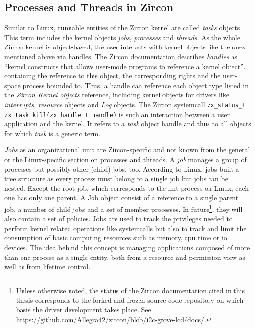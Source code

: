 \subsection{Processes and Threads in Zircon}\label{sec:processes-zircon}
Similar to Linux, runnable entities of the Zircon kernel are called \textit{tasks} objects.
This term includes the kernel objects \textit{jobs}, \textit{processes} and \textit{threads}.
As the whole Zircon kernel is object-based, the user interacts with kernel objects like the ones mentioned above via handles.
The Zircon documentation describes \textit{handles} as ``kernel constructs that allows user-mode programs to reference a kernel object''\cite{zircon-process}, containing the reference to this object, the corresponding rights and the user-space process bounded to.
Thus, a handle can reference each object type listed in the \textit{Zircon Kernel objects} reference\cite{zircon-objects}, including kernel objects for drivers like \textit{interrupts}, \textit{resource} objects and \textit{Log} objects.
The Zircon systemcall \texttt{zx\_status\_t zx\_task\_kill(zx\_handle\_t handle)} is such an interaction between a user application and the kernel. 
It refers to a \textit{task} object handle and thus to all objects for which \textit{task} is a generic term\cite{zircon-task}.

\textit{Jobs} as an organizational unit are Zircon-specific and not known from the general or the Linux-specific section on processes and threads.
A \textit{job} manages a group of processes but possibly other (child) jobs, too.
According to Linux, jobs built a tree structure as every process must belong to a single job but jobs can be nested.
Except the root job, which corresponds to the init process on Linux, each one has only one parent.
A Job object consist of a reference to a single parent job, a number of child jobs and a set of member processes.
In future\footnote{Unless otherwise noted, the status of the Zircon documentation cited in this thesis corresponds to the forked and frozen source code repository on which basis the driver development takes place. See \url{https://github.com/Allegra42/zircon/blob/i2c-grove-lcd/docs/}.}, they will also contain a set of policies\cite{zircon-job}.
Jobs are used to track the privileges needed to perform kernel related operations like systemcalls but also to track and limit the consumption of basic computing resources such as memory, \ac{cpu} time or \ac{io} devices\cite{zircon-job}.
The idea behind this concept is managing applications composed of more than one process as a single entity, both from a resource and permission view as well as from lifetime control\cite{zircon-process}.

